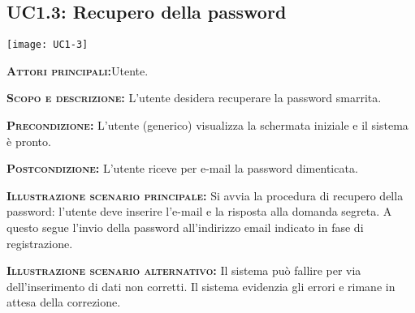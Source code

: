 \subsection{UC1.3: Recupero della password}
\begin{center}
\texttt{[image: UC1-3]}
\end{center}
\begin{description}
\item{\scshape\bfseries Attori principali:}Utente.
\item{\scshape\bfseries Scopo e descrizione:} L'utente desidera recuperare la password smarrita.
\item{\scshape\bfseries Precondizione:} L'utente (generico) visualizza la schermata iniziale e il sistema è pronto.
\item{\scshape\bfseries Postcondizione:} L'utente riceve per e-mail la password dimenticata.
\item{\scshape\bfseries Illustrazione scenario principale:} Si avvia la procedura di recupero della password: l'utente deve inserire l'e-mail e la risposta alla domanda segreta. A questo segue l'invio della password all'indirizzo email indicato in fase di registrazione.
\item{\scshape\bfseries Illustrazione scenario alternativo:} Il sistema può fallire per via dell'inserimento di dati non corretti. Il sistema evidenzia gli errori e rimane in attesa della correzione.
\end{description}

